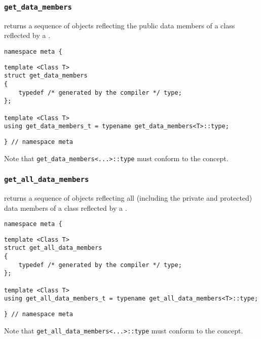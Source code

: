 

\subsubsection{\texttt{get\_data\_members}}

returns a sequence of objects reflecting the public data members of a class reflected by a .

\begin{verbatim}
namespace meta {
\end{verbatim}
\begin{verbatim}
template <Class T>
struct get_data_members
{
	typedef /* generated by the compiler */ type;
};
	
template <Class T>
using get_data_members_t = typename get_data_members<T>::type;

\end{verbatim}
\begin{verbatim}
} // namespace meta
\end{verbatim}


Note that \texttt{get\_data\_members<...>::type}
must conform to the  concept.


\subsubsection{\texttt{get\_all\_data\_members}}

returns a sequence of objects reflecting all    (including the private and protected)   data members of a class reflected by a .

\begin{verbatim}
namespace meta {
\end{verbatim}
\begin{verbatim}
template <Class T>
struct get_all_data_members
{
	typedef /* generated by the compiler */ type;
};
	
template <Class T>
using get_all_data_members_t = typename get_all_data_members<T>::type;

\end{verbatim}
\begin{verbatim}
} // namespace meta
\end{verbatim}


Note that \texttt{get\_all\_data\_members<...>::type}
must conform to the  concept.
